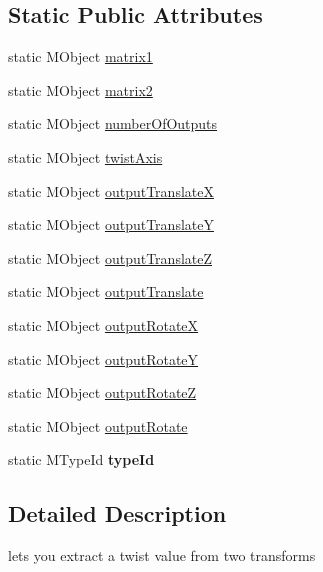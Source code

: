 \subsection*{Static Public Attributes}
\begin{DoxyCompactItemize}
\item 
static M\-Object \hyperlink{class_m_g__twist_a1f56e50333669ce2a38f71e3226ab18e}{matrix1}
\item 
static M\-Object \hyperlink{class_m_g__twist_a529b723501fff0dd68b7062a8816195b}{matrix2}
\item 
static M\-Object \hyperlink{class_m_g__twist_a53c3b473d1227aec0ff7a13d7a2ea246}{number\-Of\-Outputs}
\item 
static M\-Object \hyperlink{class_m_g__twist_a8b36730a0d0d26103ebcd04b26479c23}{twist\-Axis}
\item 
static M\-Object \hyperlink{class_m_g__twist_a290ab074cc022d06d1498fa3a96e1d20}{output\-Translate\-X}
\item 
static M\-Object \hyperlink{class_m_g__twist_acf377991d45f3bda1fb51bc6509d6d81}{output\-Translate\-Y}
\item 
static M\-Object \hyperlink{class_m_g__twist_a4dda83e85c12b6a8b58775bf1b3d38bb}{output\-Translate\-Z}
\item 
static M\-Object \hyperlink{class_m_g__twist_a7e48847c5606a677f1dc1ea4bdb3402d}{output\-Translate}
\item 
static M\-Object \hyperlink{class_m_g__twist_a20fee814720fcaee9b09f7de20f0b286}{output\-Rotate\-X}
\item 
static M\-Object \hyperlink{class_m_g__twist_a37e96db269a8af41fe9f808a35d27967}{output\-Rotate\-Y}
\item 
static M\-Object \hyperlink{class_m_g__twist_a3cae9cd439fd68b38b77ae4e439f64d5}{output\-Rotate\-Z}
\item 
static M\-Object \hyperlink{class_m_g__twist_a3908aa57e152eb462614eefb56bb82fb}{output\-Rotate}
\item 
\hypertarget{class_m_g__twist_a79fb6cae99e39340484b4434f1fd9e70}{static M\-Type\-Id {\bfseries type\-Id}}\label{class_m_g__twist_a79fb6cae99e39340484b4434f1fd9e70}

\end{DoxyCompactItemize}


\subsection{Detailed Description}
lets you extract a twist value from two transforms 


